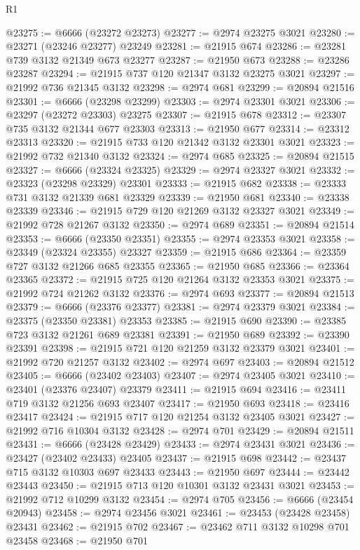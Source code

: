 \begin{lexlean}{R1}
\begin{coremodule}
@23275 := @6666 (@23272 @23273)
@23277 := @2974 @23275 @3021
@23280 := @23271 (@23246 @23277) @23249
@23281 := @21915 @674
@23286 := @23281 @739 @3132 @21349 @673 @23277
@23287 := @21950 @673
@23288 := @23286 @23287
@23294 := @21915 @737 @120 @21347 @3132 @23275 @3021
@23297 := @21992 @736 @21345 @3132
@23298 := @2974 @681
@23299 := @20894 @21516
@23301 := @6666 (@23298 @23299)
@23303 := @2974 @23301 @3021
@23306 := @23297 (@23272 @23303) @23275
@23307 := @21915 @678
@23312 := @23307 @735 @3132 @21344 @677 @23303
@23313 := @21950 @677
@23314 := @23312 @23313
@23320 := @21915 @733 @120 @21342 @3132 @23301 @3021
@23323 := @21992 @732 @21340 @3132
@23324 := @2974 @685
@23325 := @20894 @21515
@23327 := @6666 (@23324 @23325)
@23329 := @2974 @23327 @3021
@23332 := @23323 (@23298 @23329) @23301
@23333 := @21915 @682
@23338 := @23333 @731 @3132 @21339 @681 @23329
@23339 := @21950 @681
@23340 := @23338 @23339
@23346 := @21915 @729 @120 @21269 @3132 @23327 @3021
@23349 := @21992 @728 @21267 @3132
@23350 := @2974 @689
@23351 := @20894 @21514
@23353 := @6666 (@23350 @23351)
@23355 := @2974 @23353 @3021
@23358 := @23349 (@23324 @23355) @23327
@23359 := @21915 @686
@23364 := @23359 @727 @3132 @21266 @685 @23355
@23365 := @21950 @685
@23366 := @23364 @23365
@23372 := @21915 @725 @120 @21264 @3132 @23353 @3021
@23375 := @21992 @724 @21262 @3132
@23376 := @2974 @693
@23377 := @20894 @21513
@23379 := @6666 (@23376 @23377)
@23381 := @2974 @23379 @3021
@23384 := @23375 (@23350 @23381) @23353
@23385 := @21915 @690
@23390 := @23385 @723 @3132 @21261 @689 @23381
@23391 := @21950 @689
@23392 := @23390 @23391
@23398 := @21915 @721 @120 @21259 @3132 @23379 @3021
@23401 := @21992 @720 @21257 @3132
@23402 := @2974 @697
@23403 := @20894 @21512
@23405 := @6666 (@23402 @23403)
@23407 := @2974 @23405 @3021
@23410 := @23401 (@23376 @23407) @23379
@23411 := @21915 @694
@23416 := @23411 @719 @3132 @21256 @693 @23407
@23417 := @21950 @693
@23418 := @23416 @23417
@23424 := @21915 @717 @120 @21254 @3132 @23405 @3021
@23427 := @21992 @716 @10304 @3132
@23428 := @2974 @701
@23429 := @20894 @21511
@23431 := @6666 (@23428 @23429)
@23433 := @2974 @23431 @3021
@23436 := @23427 (@23402 @23433) @23405
@23437 := @21915 @698
@23442 := @23437 @715 @3132 @10303 @697 @23433
@23443 := @21950 @697
@23444 := @23442 @23443
@23450 := @21915 @713 @120 @10301 @3132 @23431 @3021
@23453 := @21992 @712 @10299 @3132
@23454 := @2974 @705
@23456 := @6666 (@23454 @20943)
@23458 := @2974 @23456 @3021
@23461 := @23453 (@23428 @23458) @23431
@23462 := @21915 @702
@23467 := @23462 @711 @3132 @10298 @701 @23458
@23468 := @21950 @701

\end{coremodule}
\end{lexlean}
